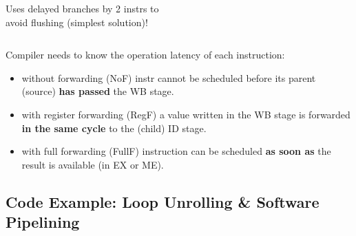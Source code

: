 \documentclass{beamer}
\newcommand{\emp}[1]{\textcolor{DikuRed}{ #1}}
\begin{document}
\begin{frame}[fragile,t]
\begin{columns}
\begin{scriptsize}
Uses \emp{delayed branches} by 2 instrs to\\avoid flushing (simplest solution)!
\end{scriptsize}
\end{columns}

\pause\smallskip

Compiler needs to know the operation latency of each instruction:\\
\begin{itemize}
    \item without forwarding (NoF) instr cannot be scheduled before its parent (source) 
            {\bf has passed} the WB stage.
    \item with register forwarding (RegF) a value written in the WB stage is forwarded
            {\bf in the same cycle} to the (child) ID stage. 
    \item with full forwarding (FullF) instruction can be scheduled {\bf as soon as} 
            the result is available (in EX or ME).
\end  {itemize}

\end{frame}

\subsection{Code Example: Loop Unrolling \& Software Pipelining}
\end{document}
